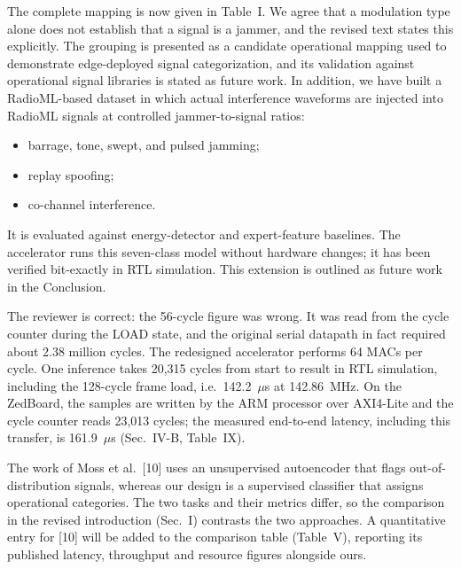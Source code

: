 \documentclass[10pt,a4paper]{article}
\begin{document}
The complete mapping is now given in Table~I. We agree that a modulation type alone does not
establish that a signal is a jammer, and the revised text states this explicitly. The grouping
is presented as a candidate operational mapping used to demonstrate edge-deployed signal
categorization, and its validation against operational signal libraries is stated as future
work. In addition, we have built a RadioML-based dataset in which actual interference waveforms
are injected into RadioML signals at controlled jammer-to-signal ratios:
\begin{itemize}
  \item barrage, tone, swept, and pulsed jamming;
  \item replay spoofing;
  \item co-channel interference.
\end{itemize}
It is evaluated against energy-detector and expert-feature baselines. The accelerator runs this
seven-class model without hardware changes; it has been verified bit-exactly in RTL simulation.
This extension is outlined as future work in the Conclusion.

The reviewer is correct: the 56-cycle figure was wrong. It was read from the cycle counter during the
LOAD state, and the original serial datapath in fact required about 2.38 million cycles. The
redesigned accelerator performs 64 MACs per cycle. One inference takes 20,315 cycles from start
to result in RTL simulation, including the 128-cycle frame load, i.e.\ 142.2~$\mu$s at
142.86~MHz. On the ZedBoard, the samples are written by the ARM processor over AXI4-Lite and the
cycle counter reads 23,013 cycles; the measured end-to-end latency, including this transfer, is
161.9~$\mu$s (Sec.~IV-B, Table~IX).

The work of Moss et al.~[10] uses an unsupervised autoencoder that flags out-of-distribution
signals, whereas our design is a supervised classifier that assigns operational categories. The
two tasks and their metrics differ, so the comparison in the revised introduction (Sec.~I)
contrasts the two approaches. A quantitative entry for [10] will be added to the comparison
table (Table~V), reporting its published latency, throughput and resource figures alongside
ours.
\end{document}
